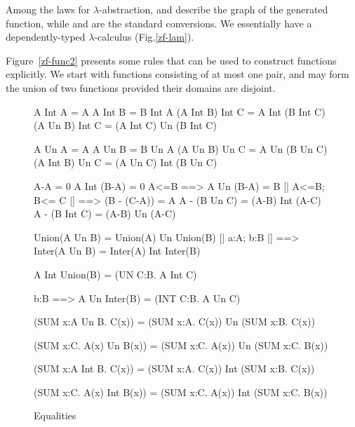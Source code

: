 Among the laws for $\lambda$-abstraction,  and 
describe the graph of the generated function, while  and
 are the standard conversions.  We essentially have a
dependently-typed $\lambda$-calculus (Fig.\ts\ref{zf-lam}).

Figure~\ref{zf-func2} presents some rules that can be used to construct
functions explicitly.  We start with functions consisting of at most one
pair, and may form the union of two functions provided their domains are
disjoint.  


\begin{figure}
\begin{ttbox}
         A Int A = A
        A Int B = B Int A
          (A Int B) Int C  =  A Int (B Int C)
     (A Un B) Int C  =  (A Int C) Un (B Int C)

          A Un A = A
         A Un B = B Un A
           (A Un B) Un C  =  A Un (B Un C)
     (A Int B) Un C  =  (A Un C) Int (B Un C)

        A-A = 0
      A Int (B-A) = 0
     A<=B ==> A Un (B-A) = B
  [| A<=B; B<= C |] ==> (B - (C-A)) = A
            A - (B Un C) = (A-B) Int (A-C)
           A - (B Int C) = (A-B) Un (A-C)

   Union(A Un B) = Union(A) Un Union(B)
   [| a:A;  b:B |] ==> 
                   Inter(A Un B) = Inter(A) Int Inter(B)

   A Int Union(B) = (UN C:B. A Int C)

    b:B ==> 
                   A Un Inter(B) = (INT C:B. A Un C)

    (SUM x:A Un B. C(x)) = 
                   (SUM x:A. C(x)) Un (SUM x:B. C(x))

    (SUM x:C. A(x) Un B(x)) =
                   (SUM x:C. A(x))  Un  (SUM x:C. B(x))

   (SUM x:A Int B. C(x)) =
                   (SUM x:A. C(x)) Int (SUM x:B. C(x))

   (SUM x:C. A(x) Int B(x)) =
                   (SUM x:C. A(x)) Int (SUM x:C. B(x))
\end{ttbox}
\caption{Equalities} \label{zf-equalities}
\end{figure}


